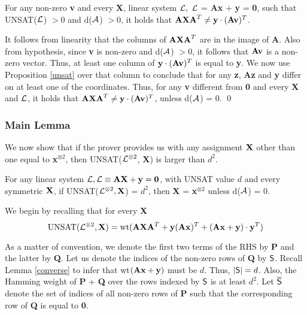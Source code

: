 \begin{proposition}\label{Non-equality}
For any non-zero {\bf v} and every {\bf X}, linear 
system ${\cal L}, \ {\cal L}$ = {\bf Ax} $+$ {\bf y} = {\bf 0}, such 
that UNSAT(${\cal L}$) $> 0$ and d(${\cal A}$) $ > 0$, 
it holds that  ${\bf AXA}^T  \ne {\bf y} \cdot ({\bf Av})^T$.
\end{proposition}
  It follows from linearity that the 
columns of ${\bf AXA}^T$ are in the image of
{\bf A}. Also from hypothesis, since {\bf v} is non-zero and d(${\cal A}$) $> 0$, 
it follows that ${\bf Av}$ is 
a non-zero vector. Thus, at least one column of ${\bf y} \cdot ({\bf Av})^T$ is 
equal to {\bf y}. We now use Proposition \ref{unsat} over that column to conclude that for any {\bf z}, {\bf Az} and {\bf y} differ
on at least one of the coordinates. Thus, for any {\bf v} different from {\bf 0} and every {\bf X} and ${\cal L}$,  
it holds that ${\bf AXA}^T  \ne {\bf y} \cdot ({\bf Av})^T$, unless d(${\cal A}$) = 0.  \qed


\subsubsection{Main Lemma}

\noindent We now show that if the prover provides us with any
assignment ${\bf X}$ other than one equal to {\bf x}$^{\otimes 2}$, then
UNSAT(${\cal L}^{\otimes 2}$, {\bf X}) is larger than $d^2$. 

\begin{lemma}\label{decode}
  For any linear system ${\cal L}, {\cal L} \equiv {\bf AX} + {\bf y} = {\bf
    0}$, with UNSAT value $d$ and every symmetric ${\bf X}$, if
  UNSAT(${\cal L}^{\otimes 2}, {\bf X}$) = $d^2$, then {\bf X} = {\bf
    x}$^{\otimes 2}$ unless d(${\cal A}$) = 0.%
\end{lemma}
 We begin by recalling that for every {\bf X}
\[
\mbox{UNSAT}({\cal L}^{\otimes 2}, {\bf X}) = \mbox{wt}({\bf AXA}^T + {\bf
  y}({\bf Ax})^T + \left({\bf Ax} + {\bf y} \right)\cdot {\bf y}^T)
\]

\noindent As a matter of convention, we denote the first two terms of the RHS 
by {\bf P} and the latter by {\bf Q}. Let us 
denote the indices of the non-zero rows of {\bf Q} by ${\sf S}$. Recall Lemma 
\ref{converse} to infer that wt$({\bf Ax} + {\bf y})$ must be $d$. 
Thus, $|{\sf S}| = d$. Also, the Hamming weight of {\bf P} + {\bf Q} over the
rows indexed by ${\sf S}$ is at least $d^2$. Let ${\overline{{\sf S}}}$ denote 
the set of indices of all non-zero rows of {\bf P} such that the 
corresponding row of {\bf Q} is equal to {\bf 0}. \\


